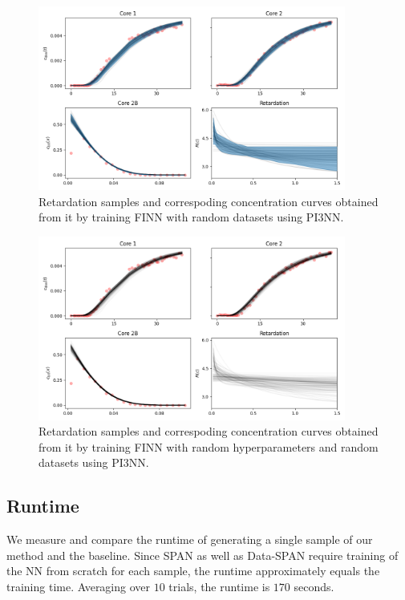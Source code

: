 \begin{figure}
    \centering
    \includegraphics[width=0.9\textwidth]{figs/finn_dataspan_samples.png}
    \caption{Retardation samples and correspoding concentration curves obtained from it by training FINN with random datasets using PI3NN.}
    \label{fig:dataspan_samples}
\end{figure}

\begin{figure}
    \centering
    \includegraphics[width=0.9\textwidth]{figs/finn_fullspan_samples.png}
    \caption{Retardation samples and correspoding concentration curves obtained from it by training FINN with random hyperparameters and random datasets using PI3NN.}
    \label{fig:fullspan_samples}
\end{figure}




\subsection{Runtime}
We measure and compare the runtime of generating a single sample of our method and the baseline. Since SPAN as well as Data-SPAN require training of the NN from scratch for each sample, the runtime approximately equals the training time. Averaging over $10$ trials, the runtime is $170$ seconds.

